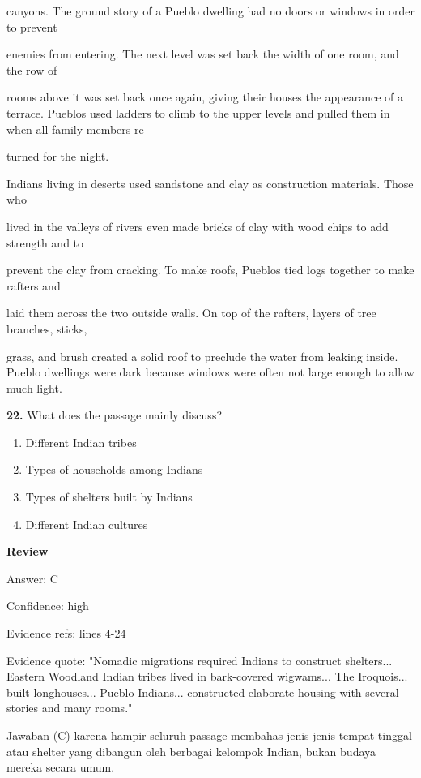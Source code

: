 \documentclass[12pt]{article}
\begin{document}
canyons. The ground story of a Pueblo dwelling had no doors or windows in order to prevent\par
enemies from entering. The next level was set back the width of one room, and the row of\par
rooms above it was set back once again, giving their houses the appearance of a terrace. Pueblos used ladders to climb to the upper levels and pulled them in when all family members re-\par
turned for the night.\par
Indians living in deserts used sandstone and clay as construction materials. Those who\par
lived in the valleys of rivers even made bricks of clay with wood chips to add strength and to\par
prevent the clay from cracking. To make roofs, Pueblos tied logs together to make rafters and\par
laid them across the two outside walls. On top of the rafters, layers of tree branches, sticks,\par
grass, and brush created a solid roof to preclude the water from leaking inside. Pueblo dwellings were dark because windows were often not large enough to allow much light.\par
\endgroup
\medskip
\noindent\textbf{22.} What does the passage mainly discuss?
\begin{enumerate}[label=(\Alph*),leftmargin=*,itemsep=0.2em]
\item Different Indian tribes
\item Types of households among Indians
\item Types of shelters built by Indians
\item Different Indian cultures
\end{enumerate}
\par
\begingroup
\setlength{\parskip}{0pt}
\setlength{\parindent}{0pt}
\textbf{Review}\par
Answer: C\par
Confidence: high\par
Evidence refs: lines 4-24\par
Evidence quote: "Nomadic migrations required Indians to construct shelters... Eastern Woodland Indian tribes lived in bark-covered wigwams... The Iroquois... built longhouses... Pueblo Indians... constructed elaborate housing with several stories and many rooms."\par
Jawaban (C) karena hampir seluruh passage membahas jenis-jenis tempat tinggal atau shelter yang dibangun oleh berbagai kelompok Indian, bukan budaya mereka secara umum.\par
\end{document}
